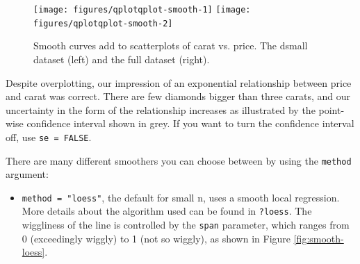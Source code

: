 \begin{Shaded}
\begin{Highlighting}[]
  \NormalTok{(}\NormalTok{, }\NormalTok{))}
  \NormalTok{(}\NormalTok{, }\NormalTok{))}
\end{Highlighting}
\end{Shaded}

\begin{figure}

{\centering \texttt{[image: figures/qplotqplot-smooth-1]} \texttt{[image: figures/qplotqplot-smooth-2]} 

}

\caption{Smooth curves add to scatterplots of carat vs. price. The dsmall dataset (left) and the full dataset (right).\label{fig:qplot-smooth}}
\end{figure}

Despite overplotting, our impression of an exponential relationship
between price and carat was correct. There are few diamonds bigger than
three carats, and our uncertainty in the form of the relationship
increases as illustrated by the point-wise confidence interval shown in
grey. If you want to turn the confidence interval off, use
\texttt{se = FALSE}.

There are many different smoothers you can choose between by using the
\texttt{method} argument:

\begin{itemize}
\itemsep1pt\parskip0pt
\item
  \texttt{method = "loess"}, the default for small n, uses a smooth
  local regression. More details about the algorithm used can be found
  in \texttt{?loess}. The wiggliness of the line is controlled by the
  \texttt{span} parameter, which ranges from 0 (exceedingly wiggly) to 1
  (not so wiggly), as shown in Figure \ref{fig:smooth-loess}.
\end{itemize}

\begin{Shaded}
\begin{Highlighting}[]
  \NormalTok{(}\NormalTok{, }\NormalTok{), }
   \NormalTok{)}
  \NormalTok{(}\NormalTok{, }\NormalTok{), }
   \NormalTok{)}
\end{Highlighting}
\end{Shaded}

